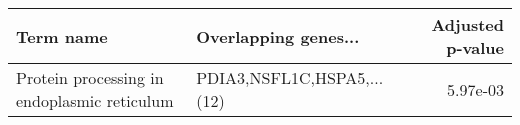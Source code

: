 \begin{tabular}{llr}
\toprule
                                  Term name &       Overlapping genes... &  Adjusted p-value \\
\midrule
Protein processing in endoplasmic reticulum & PDIA3,NSFL1C,HSPA5,...(12) &          5.97e-03 \\
\bottomrule
\end{tabular}

